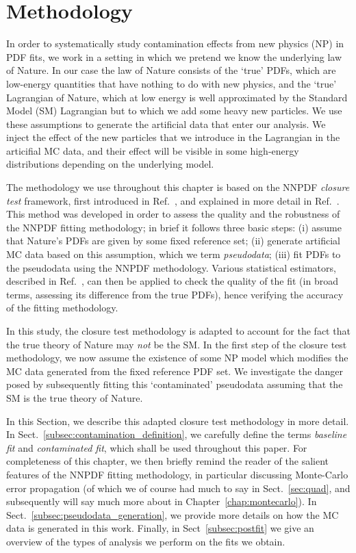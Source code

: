\documentclass[withindex,glossary]{cam-thesis}
\begin{document}
\section{Methodology}
\label{sec:methodology}

In order to systematically study contamination effects from new physics (NP) in PDF fits, we work in a setting in which we pretend
we know the underlying law of Nature. In our case the law of Nature consists of the `true'
PDFs, which are low-energy quantities that have nothing to do with new physics, and the `true'
Lagrangian of Nature, which at low energy is well approximated by the Standard Model (SM) 
Lagrangian but to which we add some heavy new particles.
We use these assumptions to generate the artificial data that enter our analysis.
We inject the effect of the new particles that we introduce in the Lagrangian in the articifial MC data, and their effect 
will be visible in some high-energy distributions depending on the underlying model. 

The methodology we use throughout this chapter is based on the NNPDF \textit{closure test} framework,
first introduced in Ref.~\cite{NNPDF:2014otw}, and explained in more detail in Ref.~\cite{DelDebbio:2021whr}.
This method was developed
in order to assess the quality and the robustness of the NNPDF fitting methodology; in brief it follows three basic steps: (i) assume that Nature's PDFs
are given by some fixed reference set; (ii) generate artificial MC data based on this assumption, which we term \textit{pseudodata}; 
(iii) fit PDFs to the pseudodata using the NNPDF methodology. Various statistical estimators, described in Ref.~\cite{DelDebbio:2021whr}, can then be applied to 
check the quality of the fit (in broad terms, assessing its difference from the true PDFs), hence verifying the accuracy of the fitting methodology.

In this study, the closure test methodology is adapted to account for the fact that the true theory of Nature may \textit{not} be the 
SM. In the first step of the closure test methodology, we now assume the existence of some NP model which modifies
the MC data generated from the fixed reference PDF set. We investigate the danger posed by subsequently fitting this `contaminated' 
pseudodata assuming that the SM is the true theory of Nature.

In this Section, we describe this adapted closure test methodology in more detail. 
In Sect.~\ref{subsec:contamination_definition}, we carefully define the terms \textit{baseline fit} and \textit{contaminated fit}, 
which shall be used throughout this paper. For completeness of this chapter, we then briefly remind the reader of the salient features of the NNPDF fitting methodology, in particular discussing 
Monte-Carlo error propagation (of which we of course had much to say in Sect.~\ref{sec:quad}, and subsequently will say much more about in Chapter~\ref{chap:montecarlo}). In Sect.~\ref{subsec:pseudodata_generation}, we provide more details on how the MC data is generated in this work. 
Finally, in Sect~\ref{subsec:postfit} we give an overview of the types of analysis we perform on the fits we obtain.
\end{document}
